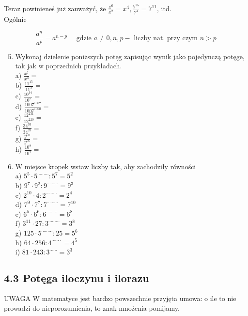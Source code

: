 \documentclass[10pt]{article}
\begin{document}
Teraz powinieneś już zauważyć, że \(\frac{x^{6}}{x^{2}}=x^{4}, \frac{7^{15}}{7^{4}}=7^{11}\), itd.\\
Ogólnie

\[
\frac{a^{n}}{a^{p}}=a^{n-p} \quad \text { gdzie } a \neq 0, n, p-\text { liczby nat. przy czym } n>p
\]

\begin{enumerate}
  \setcounter{enumi}{4}
  \item Wykonaj dzielenie poniższych potęg zapisując wynik jako pojedynczą potęge, tak jak w poprzednich przykładach.\\
a) \(\frac{x^{7}}{x^{3}}=\)\\
b) \(\frac{11^{15}}{11^{3}}=\)\\
c) \(\frac{10^{14}}{10^{5}}=\)\\
d) \(\frac{1007^{1007}}{1007^{1000}}=\)\\
e) \(\frac{12^{231}}{12^{229}}=\)\\
f) \(\frac{34^{33}}{34^{23}}=\)\\
g) \(\frac{y^{60}}{y^{56}}=\)\\
h) \(\frac{10^{8}}{10^{5}}=\)
  \item W miejsce kropek wstaw liczby tak, aby zachodziły równości\\
a) \(5^{5} \cdot 5^{\cdots \cdots \cdots}: 5^{7}=5^{2}\)\\
b) \(9^{7} \cdot 9^{2}: 9^{\cdots \cdots \cdots}=9^{3}\)\\
c) \(2^{10} \cdot 4: 2^{\cdots \cdots \cdots}=2^{4}\)\\
d) \(7^{9} \cdot 7^{7}: 7^{\cdots \cdots \cdots}=7^{10}\)\\
e) \(6^{5} \cdot 6^{6}: 6^{\cdots \cdots \cdots}=6^{8}\)\\
f) \(3^{11} \cdot 27: 3^{\cdots \cdots \cdots}=3^{8}\)\\
g) \(125 \cdot 5^{\cdots \cdots \cdots}: 25=5^{6}\)\\
h) \(64 \cdot 256: 4^{\cdots \cdots \cdot}=4^{5}\)\\
i) \(81 \cdot 243: 3^{\cdots \cdots}=3^{3}\)
\end{enumerate}

\subsection*{4.3 Potęga iloczynu i ilorazu}
UWAGA W matematyce jest bardzo powszechnie przyjęta umowa: o ile to nie prowadzi do nieporozumienia, to znak mnożenia pomijamy.
\end{document}
